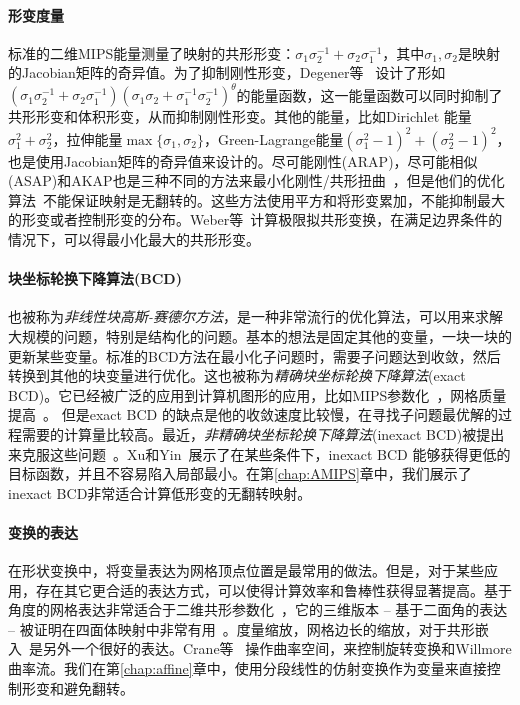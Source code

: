 \paragraph{形变度量} 标准的二维MIPS能量测量了映射的共形形变：$\sigma_1\sigma_2^{-1} + \sigma_2  \sigma_1^{-1}$，其中$\sigma_1,\sigma_2$是映射的Jacobian矩阵的奇异值。为了抑制刚性形变，Degener等~\cite{Degener2003} 设计了形如$(\sigma_1\sigma_2^{-1} + \sigma_2  \sigma_1^{-1})(\sigma_1\sigma_2+\sigma_1^{-1}\sigma_2^{-1})^\theta$的能量函数，这一能量函数可以同时抑制了共形形变和体积形变，从而抑制刚性形变。其他的能量，比如Dirichlet 能量$\sigma_1^2+\sigma_2^2$，拉伸能量$\max\{\sigma_1,\sigma_2\}$，Green-Lagrange能量$(\sigma_1^2-1)^2+(\sigma_2^2-1)^2$，也是使用Jacobian矩阵的奇异值来设计的。尽可能刚性(ARAP)，尽可能相似(ASAP)和AKAP也是三种不同的方法来最小化刚性/共形扭曲~\cite{Alexa2000,Igarashi2005,Sorkine2007,Solomon2011}，但是他们的优化算法~\cite{Liu2008,Solomon2011}不能保证映射是无翻转的。这些方法使用平方和将形变累加，不能抑制最大的形变或者控制形变的分布。Weber等~\cite{Weber2012}计算极限拟共形变换，在满足边界条件的情况下，可以得最小化最大的共形形变。

\paragraph{块坐标轮换下降算法(BCD) }也被称为\emph{非线性块高斯-赛德尔方法}，是一种非常流行的优化算法，可以用来求解大规模的问题，特别是结构化的问题。基本的想法是固定其他的变量，一块一块的更新某些变量。标准的BCD方法在最小化子问题时，需要子问题达到收敛，然后转换到其他的块变量进行优化。这也被称为\emph{精确块坐标轮换下降算法}(exact BCD)。它已经被广泛的应用到计算机图形的应用，比如MIPS参数化~\cite{Hormann2000}，网格质量提高~\cite{Diachin2006}。 但是exact BCD 的缺点是他的收敛速度比较慢，在寻找子问题最优解的过程需要的计算量比较高。最近，\emph{非精确块坐标轮换下降算法}(inexact BCD)被提出来克服这些问题~\cite{Bonettini2011,Tappenden2013,Cassioli2013}。Xu和Yin~\cite{Xu2013}展示了在某些条件下，inexact BCD 能够获得更低的目标函数，并且不容易陷入局部最小。在第\ref{chap:AMIPS}章中，我们展示了inexact BCD非常适合计算低形变的无翻转映射。

\paragraph{变换的表达} 在形状变换中，将变量表达为网格顶点位置是最常用的做法。但是，对于某些应用，存在其它更合适的表达方式，可以使得计算效率和鲁棒性获得显著提高。基于角度的网格表达非常适合于二维共形参数化~\cite{Sheffer2001,Sheffer2005}，它的三维版本 -- 基于二面角的表达 -- 被证明在四面体映射中非常有用~\cite{Gilles2015}。度量缩放，网格边长的缩放，对于共形嵌入~\cite{Springborn2008,Ben-Chen2008}是另外一个很好的表达。Crane等~\cite{Crane2011,Crane2013} 操作曲率空间，来控制旋转变换和Willmore曲率流。我们在第\ref{chap:affine}章中，使用分段线性的仿射变换作为变量来直接控制形变和避免翻转。

